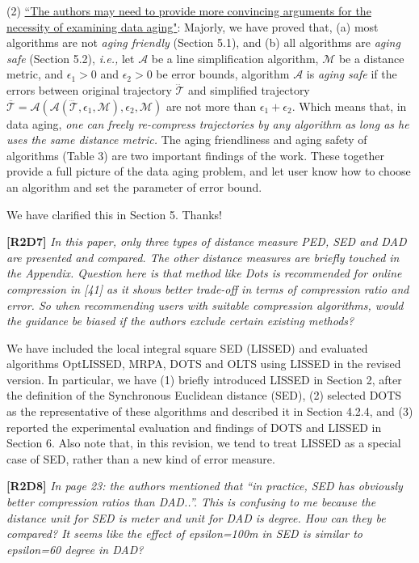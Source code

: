\documentclass{letter}
\newcommand{\ie}{\emph{i.e.,}\xspace}
\begin{document}
(2) \underline{``The authors may need to provide more convincing arguments for the necessity of examining data aging"}: Majorly, we have proved that, (a) most algorithms are not \emph{aging friendly} (Section 5.1), and (b) all algorithms are \emph{aging safe} (Section 5.2), \ie let $\mathcal{A}$ be a line simplification algorithm,  $\mathcal{M}$ be a distance metric, and $\epsilon_1>0$ and $\epsilon_2>0$ be error bounds, algorithm $\mathcal{A}$ is \emph{aging safe} if the errors between original trajectory $\dddot{\mathcal{T}}$ and simplified trajectory $\overline{\mathcal{T}}=\mathcal{A}(\mathcal{A}(\dddot{\mathcal{T}}, \epsilon_1, \mathcal{M}), \epsilon_2, \mathcal{M})$ are not more than $\epsilon_1+ \epsilon_2$. Which means that, in data aging, \emph{one can freely re-compress trajectories by any algorithm as long as he uses the same distance metric.} The aging friendliness and aging safety of algorithms (Table 3) are two important findings of the work. These together provide a full picture of the data aging problem, and let user know how to choose an algorithm and set the parameter of error bound. 

We have clarified this in Section 5. Thanks!


\textbf{[R2D7]} \emph{In this paper, only three types of distance measure PED, SED and DAD are presented and compared. The other distance measures are briefly touched in the Appendix. Question here is that method like Dots is recommended for online compression in [41] as it shows better trade-off in terms of compression ratio and error. So when recommending users with suitable compression algorithms, would the guidance be biased if the authors exclude certain existing methods?}

We have included the local integral square SED (LISSED) and evaluated algorithms OptLISSED, MRPA, DOTS and OLTS using LISSED in the revised version. In particular, we have (1) briefly introduced LISSED in Section 2, after the definition of the Synchronous Euclidean distance (SED), (2) selected DOTS as the representative of these algorithms and described it in Section 4.2.4, and
(3) reported the experimental evaluation and findings of DOTS and LISSED in Section 6.
Also note that, in this revision, we tend to treat LISSED as a special case of SED, rather than a new kind of error measure.

\textbf{[R2D8]} \emph{In page 23: the authors mentioned that “in practice, SED has obviously better compression ratios than DAD..”. This is confusing to me because the distance unit for SED is meter and unit for DAD is degree. How can they be compared? It seems like the effect of epsilon=100m in SED is similar to epsilon=60 degree in DAD?}
\end{document}
